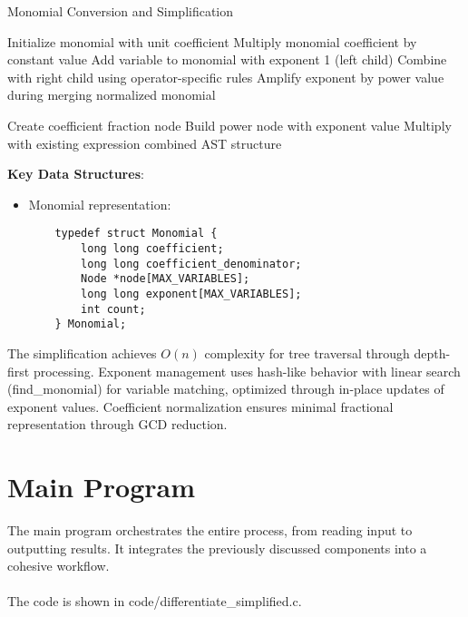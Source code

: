 \documentclass{report}
\begin{document}
\begin{algorithm}[H]
\caption{Monomial Conversion and Simplification}
\begin{algorithmic}[1]
    \State Initialize monomial with unit coefficient
        \State Multiply monomial coefficient by constant value
        \State Add variable to monomial with exponent 1
        \State {}(left child)
        \State Combine with right child using operator-specific rules
        \State Amplify exponent by power value during merging
    \EndIf
    \State \Return normalized monomial
\EndProcedure

    \State Create coefficient fraction node
            \State Build power node with exponent value
            \State Multiply with existing expression
        \EndIf
    \EndFor
    \State \Return combined AST structure
\EndProcedure
\end{algorithmic}
\end{algorithm}

\textbf{Key Data Structures}:
\begin{itemize}
    \item Monomial representation:
    \begin{verbatim}
    typedef struct Monomial {
        long long coefficient;
        long long coefficient_denominator;
        Node *node[MAX_VARIABLES];
        long long exponent[MAX_VARIABLES];
        int count;
    } Monomial;
    \end{verbatim}
\end{itemize}

The simplification achieves $O(n)$ complexity for tree traversal through depth-first processing. Exponent management uses hash-like behavior with linear search (find\_monomial) for variable matching, optimized through in-place updates of exponent values. Coefficient normalization ensures minimal fractional representation through GCD reduction.

\section*{Main Program}
The main program orchestrates the entire process, from reading input to outputting results. It integrates the previously discussed components into a cohesive workflow. \\
\\
The code is shown in code/differentiate\_simplified.c.
\end{document}
